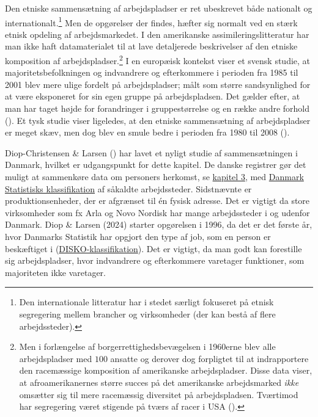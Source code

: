 \documentclass[
]{book}
\begin{document}
Den etniske sammensætning af arbejdspladser er ret ubeskrevet både nationalt og internationalt.\footnote{Den internationale litteratur har i stedet særligt fokuseret på etnisk segregering mellem brancher og virksomheder (der kan bestå af flere arbejdssteder).} Men de opgørelser der findes, hæfter sig normalt ved en stærk etnisk opdeling af arbejdsmarkedet. I den amerikanske assimileringslitteratur har man ikke haft datamaterialet til at lave detaljerede beskrivelser af den etniske komposition af arbejdspladser.\footnote{Men i forlængelse af borgerrettighedsbevægelsen i 1960erne blev alle arbejdspladser med \(100\) ansatte og derover dog forpligtet til at indrapportere den racemæssige komposition af amerikanske arbejdspladser. Disse data viser, at afroamerikanernes større succes på det amerikanske arbejdsmarked \emph{ikke} omsætter sig til mere racemæssig diversitet på arbejdspladsen. Tværtimod har segregering været stigende på tværs af racer i USA ().} I en europæisk kontekst viser et svensk studie, at majoritetsbefolkningen og indvandrere og efterkommere i perioden fra 1985 til 2001 blev mere ulige fordelt på arbejdspladser; målt som større sandsynlighed for at være eksponeret for sin egen gruppe på arbejdspladsen. Det gælder efter, at man har taget højde for forandringer i gruppestørrelse og en række andre forhold (). Et tysk studie viser ligeledes, at den etniske sammensætning af arbejdspladser er meget skæv, men dog blev en smule bedre i perioden fra 1980 til 2008 ().

Diop-Christensen \& Larsen () har lavet et nyligt studie af sammensætningen i Danmark, hvilket er udgangspunkt for dette kapitel. De danske registrer gør det muligt at sammenkøre data om personers herkomst, se \hyperref[kap2]{kapitel 3}, med \href{https://www.dst.dk/Site/Dst/SingleFiles/GetArchiveFile.aspx?fi=659482655935&fo=0&ext=kvaldel}{Danmark Statistisks klassifikation} af såkaldte arbejdssteder. Sidstnævnte er produktionsenheder, der er afgrænset til én fysisk adresse. Det er vigtigt da store virksomheder som fx Arla og Novo Nordisk har mange arbejdssteder i og udenfor Danmark. Diop \& Larsen (2024) starter opgørelsen i 1996, da det er det første år, hvor Danmarks Statistik har opgjort den type af job, som en person er beskæftiget i (\href{https://www.dst.dk/Site/Dst/SingleFiles/GetArchiveFile.aspx?fi=2299282738&fo=0&ext=kvaldel}{DISKO-klassifikation}). Det er vigtigt, da man godt kan forestille sig arbejdspladser, hvor indvandrere og efterkommere varetager funktioner, som majoriteten ikke varetager.
\end{document}
